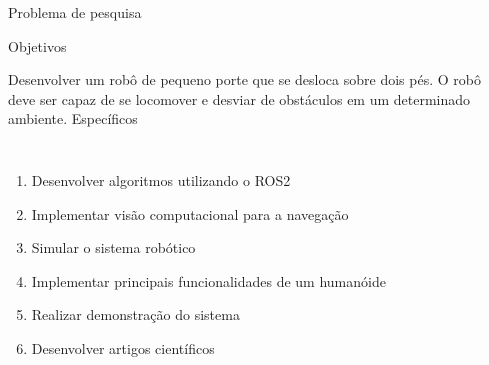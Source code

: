 \begin{frame}[c]{Problema de pesquisa} 
    \transdissolve[duration=0.5]
   
    \begin{center}
    \end{center}
    
   
\end{frame}
\begin{frame}[t]{Objetivos} 
    \transdissolve[duration=0.5]
    
        Desenvolver um robô de pequeno porte que se desloca sobre dois pés. O robô deve ser capaz de se locomover e desviar de obstáculos em um determinado ambiente.
        \newline
        \newline
         Específicos
        \begin{columns}[t]
                \begin{enumerate}
                    \item Desenvolver algoritmos utilizando o ROS2
                    \item Implementar visão computacional para a navegação
                    \item Simular o sistema robótico
                    \item Implementar principais funcionalidades de um humanóide
                    \item Realizar demonstração do sistema
                    \item Desenvolver artigos científicos
                \end{enumerate}
        \end{columns}
\end{frame}
